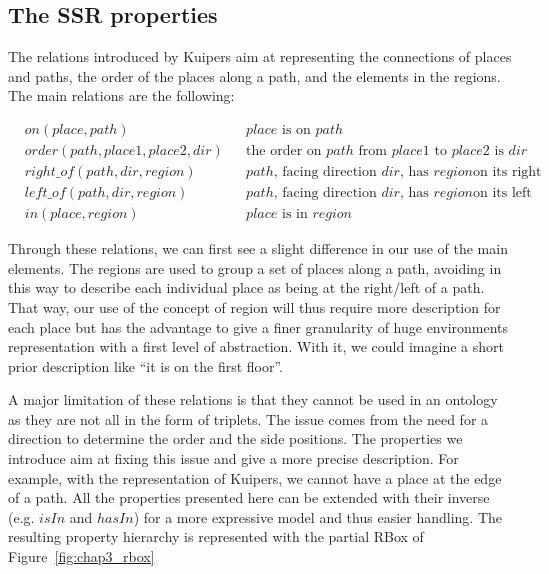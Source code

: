 \subsection{The SSR properties}

The relations introduced by Kuipers aim at representing the connections of places and paths, the order of the places along a path, and the elements in the regions. The main relations are the following:

\begin{align*}
&on(place,path) && place \text{ is on } path \\
&order(path,place1,place2,dir) && \text{the order on } path \text{ from } place1 \text{ to } place2 \text{ is } dir \\
&right\_of(path,dir,region) && path \text{, facing direction } dir \text{, has } region \text{on its right}\\
&left\_of(path,dir,region) && path \text{, facing direction } dir \text{, has } region \text{on its left} \\
&in(place,region) && place \text{ is in } region
\end{align*}

Through these relations, we can first see a slight difference in our use of the main elements. The regions are used to group a set of places along a path, avoiding in this way to describe each individual place as being at the right/left of a path. That way, our use of the concept of region will thus require more description for each place but has the advantage to give a finer granularity of huge environments representation with a first level of abstraction. With it, we could imagine a short prior description like ``it is on the first floor''.

A major limitation of these relations is that they cannot be used in an ontology as they are not all in the form of triplets. The issue comes from the need for a direction to determine the order and the side positions. The properties we introduce aim at fixing this issue and give a more precise description. For example, with the representation of Kuipers, we cannot have a place at the edge of a path. All the properties presented here can be extended with their inverse (e.g. $isIn$ and $hasIn$) for a more expressive model and thus easier handling. The resulting property hierarchy is represented with the partial RBox of Figure~\ref{fig:chap3_rbox} 


